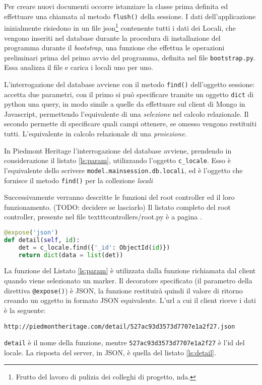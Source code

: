 Per creare nuovi documenti occorre istanziare la classe prima definita ed effettuare una chiamata al metodo \texttt{flush()} della sessione. I dati dell'applicazione inizialmente risiedono in un file json\footnote{Frutto del lavoro di pulizia dei colleghi di progetto, nda.} contenente tutti i dati dei Locali, che vengono inseriti nel database durante la procedura di installazione del programma durante il \emph{bootstrap}, una funzione che effettua le operazioni preliminari prima del primo avvio del programma, definita nel file \texttt{bootstrap.py}. Essa analizza il file e carica i locali uno per uno.

L'interrogazione del database avviene con il metodo \texttt{find()} dell'oggetto sessione: accetta due parametri, con il primo si può specificare tramite un oggetto \texttt{dict} di python una query, in modo simile a quelle da effettuare sul client di Mongo in Javascript, permettendo l'equivalente di una \emph{selezione} nel calcolo relazionale. Il secondo permette di specificare quali campi ottenere, se omesso vengono restituiti tutti. L'equivalente in calcolo relazionale di una \emph{proiezione}.

In Piedmont Heritage l'interrogazione del database avviene, prendendo in considerazione il listato \ref{ls:param}, utilizzando l'oggetto \texttt{c\_locale}. Esso è l'equivalente dello scrivere \texttt{model.mainsession.db.locali}, ed è l'oggetto che fornisce il metodo \texttt{find()} per la collezione \emph{locali}


Successivamente verranno descritte le funzioni del root controller ed il loro funzionamento.
(TODO: decidere se lasciarlo) Il listato completo del root controller, presente nel file texttt{controllers/root.py} è a pagina \pageref{ls:completo}.

\begin{lstlisting}[label=ls:param,caption={Funzione utilizzata per richiedere i dettagli su un locale con ID=\texttt{id}},language=Python]
@expose('json')
def detail(self, id):
    det = c_locale.find({'_id': ObjectId(id)})
    return dict(data = list(det))
\end{lstlisting}

La funzione del Listato \ref{ls:param} è utilizzata dalla funzione richiamata dal client quando viene selezionato un marker. Il decoratore specificato (il parametro della direttiva \texttt{@expose()}) è JSON, la funzione restituirà quindi il valore di ritorno creando un oggetto in formato JSON equivalente. L'url a cui il client riceve i dati è la seguente:
\begin{lstlisting}
http://piedmontheritage.com/detail/527ac93d3573d7707e1a2f27.json
\end{lstlisting}
\texttt{detail} è il nome della funzione, mentre \texttt{527ac93d3573d7707e1a2f27} è l'id del locale. La risposta del server, in JSON, è quella del listato \ref{ls:detail}.

